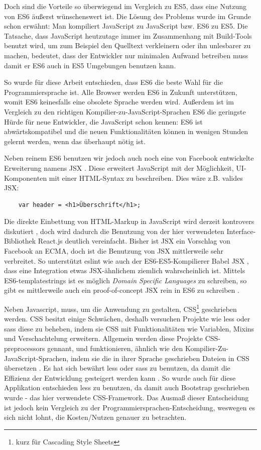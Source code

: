 \documentclass[12pt,twoside]{book}
\begin{document}
Doch sind die Vorteile so überwiegend im Vergleich zu ES5, dass eine Nutzung von ES6 äußerst wünschenswert ist.
Die Lösung des Problems wurde im Grunde schon erwähnt: Man kompiliert JavaScript zu JavaScript bzw. ES6 zu ES5.
Die Tatsache, dass JavaScript heutzutage immer im Zusammenhang mit Build-Tools benutzt wird, um zum Beispiel den Quelltext verkleinern oder ihn unlesbarer zu machen, bedeutet, dass der Entwickler nur minimalen Aufwand betreiben muss damit er ES6 auch in ES5 Umgebungen benutzen kann.

So wurde für diese Arbeit entschieden, dass ES6 die beste Wahl für die Programmiersprache ist. Alle Browser werden ES6 in Zukunft unterstützen, womit ES6 keinesfalls eine obsolete Sprache werden wird. Außerdem ist im Vergleich zu den richtigen Kompilier-zu-JavaScript-Sprachen ES6 die geringste Hürde für neue Entwickler, die JavaScript schon kennen: ES6 ist abwärtskompatibel und die neuen Funktionalitäten können in wenigen Stunden gelernt werden, wenn das überhaupt nötig ist.

Neben reinem ES6 benutzen wir jedoch auch noch eine von Facebook entwickelte Erweiterung namens JSX \cite{jsx}. Diese erweitert JavaScript mit der Möglichkeit, UI-Komponenten mit einer HTML-Syntax zu beschreiben. Dies wäre z.B. valides JSX:

\begin{verbatim}
    var header = <h1>Überschrift</h1>;
\end{verbatim}

Die direkte Einbettung von HTML-Markup in JavaScript wird derzeit kontrovers diskutiert \cite{jsxcontrovers}, doch wird dadurch die Benutzung von der hier verwendeten Interface-Bibliothek React.js deutlich vereinfacht.
Bisher ist JSX ein Vorschlag von Facebook an ECMA, doch ist die Benutzung von JSX mittlerweile sehr verbreitet. So unterstützt eslint \cite{eslint} wie auch der ES6-ES5-Kompilierer Babel JSX \cite{babel}, dass eine Integration etwas JSX-ähnlichem ziemlich wahrscheinlich ist.
Mittels ES6-templatestrings ist es möglich \textit{Domain Specific Languages} zu schreiben, so gibt es mittlerweile auch ein proof-of-concept JSX rein in ES6 zu schreiben \cite{templatestrings}.

Neben Javascript, muss, um die Anwendung zu gestalten, CSS\footnote{kurz für Cascading Style Sheets} geschrieben werden. CSS besitzt einige Schwächen, deshalb versuchen Projekte wie less \cite{less} oder sass \cite{sass} diese zu beheben, indem sie CSS mit Funktionalitäten wie Variablen, Mixins und Verschachtelung erweitern.
Allgemein werden diese Projekte CSS-preprocessors gennant, und funktionieren,
ähnlich wie den Kompilier-Zu-JavaScript-Sprachen, indem sie die in ihrer Sprache geschrieben Dateien in CSS übersetzen \cite{csspre}.
Es hat sich bewährt less oder sass zu benutzen, da damit die Effizienz der Entwicklung gesteigert werden kann \cite{csspre}. So wurde auch für diese Applikation entschieden less zu benutzen, da damit auch Bootstrap geschrieben wurde - das hier verwendete CSS-Framework.
Das Ausmaß dieser Entscheidung ist jedoch kein Vergleich zu der Programmiersprachen-Entscheidung, weswegen es sich nicht lohnt, die Kosten/Nutzen genauer zu betrachten.
\end{document}

